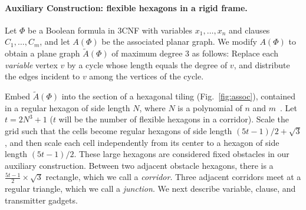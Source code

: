\documentclass{article}
\theoremstyle{plain}%
\begin{document}
\paragraph{Auxiliary Construction: flexible hexagons in a rigid frame.}
Let $\Phi$ be a Boolean formula in 3CNF with variables $x_1,\ldots , x_n$ and clauses $C_1,\ldots ,C_m$, and let $A(\Phi)$ be the associated planar graph. We modify $A(\Phi)$ to obtain a plane graph $\tilde{A}(\Phi)$ of maximum degree 3 as follows: Replace each \emph{variable} vertex $v$ by a cycle whose length equals the degree of $v$, and distribute the edges incident to $v$ among the vertices of the cycle.

Embed $\tilde{A}(\Phi)$ into the section of a hexagonal tiling (Fig.~\ref{fig:assoc}), contained in a regular hexagon of side length $N$, where $N$ is a polynomial of $n$ and $m$~\cite{BK+98}. Let $t=2N^3+1$ ($t$ will be the number of flexible hexagons in a corridor). Scale the grid such that the cells become regular hexagons of side length $(5t-1)/2+\sqrt{3}$, and then scale each cell independently from its center to a hexagon of side length $(5t-1)/2$. These large hexagons are considered fixed obstacles in our auxiliary construction. Between two adjacent obstacle hexagons, there is a $\frac{5t-1}{2}\times \sqrt{3}$ rectangle, which we call a \emph{corridor}. Three adjacent corridors meet at a regular triangle, which we call a \emph{junction}. We next describe variable, clause, and transmitter gadgets.
\end{document}
